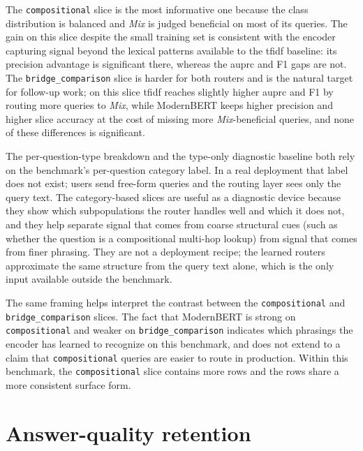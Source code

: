 \documentclass[english, bibtex]{kththesis}               %
\numberwithin{listing}{chapter}
\providecommand{\DIFdelend}{} %
\begin{document}
\DIFdelend The \texttt{compositional} slice is the most informative one because the class distribution is balanced and \emph{Mix} is judged beneficial on most of its queries. The gain on this slice despite the small training set is consistent with the encoder capturing signal beyond the lexical patterns available to the \gls{tfidf} baseline: its precision advantage is significant there, whereas the \gls{auprc} and F1 gaps are not. The \texttt{bridge\_comparison} slice is harder for both routers and is the natural target for follow-up work; on this slice \gls{tfidf} reaches slightly higher \gls{auprc} and F1 by routing more queries to \emph{Mix}, while ModernBERT keeps higher precision and higher slice accuracy at the cost of missing more \emph{Mix}-beneficial queries, and none of these differences is significant.

The per-question-type breakdown and the type-only diagnostic baseline both rely on the benchmark's per-question category label. In a real deployment that label does not exist; users send free-form queries and the routing layer sees only the query text. The category-based slices are useful as a diagnostic device because they show which subpopulations the router handles well and which it does not, and they help separate signal that comes from coarse structural cues (such as whether the question is a compositional multi-hop lookup) from signal that comes from finer phrasing. They are not a deployment recipe; the learned routers approximate the same structure from the query text alone, which is the only input available outside the benchmark.

The same framing helps interpret the contrast between the \texttt{compositional} and \texttt{bridge\_comparison} slices. The fact that ModernBERT is strong on \texttt{compositional} and weaker on \texttt{bridge\_comparison} indicates which phrasings the encoder has learned to recognize on this benchmark, and does not extend to a claim that \texttt{compositional} queries are easier to route in production. Within this benchmark, the \texttt{compositional} slice contains more rows and the rows share a more consistent surface form.

\section{Answer-quality retention}
\label{sec:resultsRetention}
\end{document}
